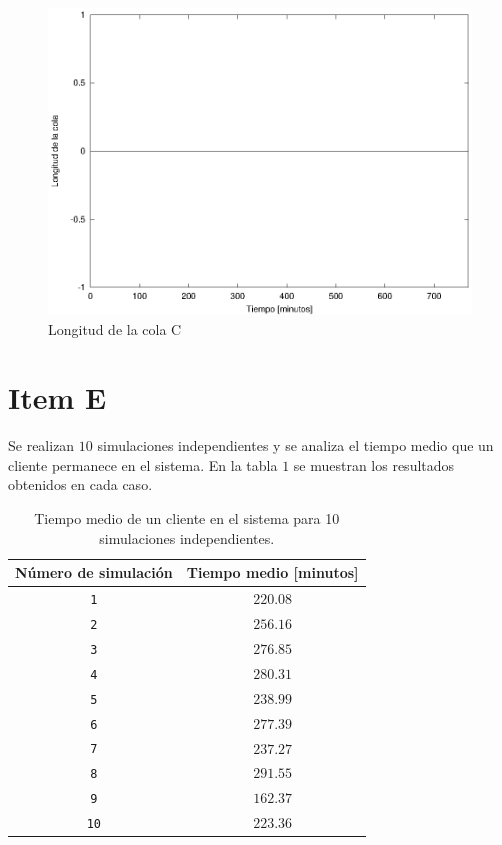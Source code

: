 \documentclass[a4paper,10pt]{article}
\begin{document}
\begin{figure}[hp]
\centering
\includegraphics{graficos/plot_longitud_C.eps}
\caption{Longitud de la cola C}
\label{fig:colaC}
\end{figure}

\section*{Item E}

%
%

Se realizan $10$ simulaciones independientes y se analiza el tiempo medio
que un cliente permanece en el sistema. En la tabla $1$
se muestran los resultados obtenidos en cada caso.

\begin{table}
\begin{center}
\begin{tabular}{cc} \hline \hline
N\'umero de simulaci\'on & Tiempo medio [minutos] \\ \hline
\texttt{1}	& $220.08$ \\
\texttt{2}	& $256.16$ \\
\texttt{3}	& $276.85$ \\
\texttt{4}	& $280.31$ \\
\texttt{5}	& $238.99$ \\
\texttt{6}	& $277.39$ \\
\texttt{7}	& $237.27$ \\
\texttt{8}	& $291.55$ \\
\texttt{9}	& $162.37$ \\
\texttt{10}	& $223.36$ \\
\hline \hline
\end{tabular}
\end{center}
\label{tab:tiemposmedios}
\vspace{4pt}
\caption{Tiempo medio de un cliente en el sistema para 10 simulaciones
independientes.}
\end{table}
\end{document}
